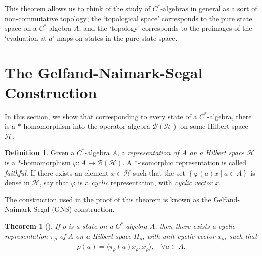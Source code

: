 \documentclass[11pt,a4paper]{report}
\theoremstyle{plain}
\newtheorem{thm}{Theorem}
\theoremstyle{definition}
\newtheorem{defn}{Definition}
\newcommand{\1}{\mathbbm{1}}
\renewcommand{\H}{\mathcal{H}}
\newcommand{\B}{\mathcal{B}}
\newcommand{\BH}{\mathcal{\B(\H)}}
\renewcommand{\phi}{\varphi}
\begin{document}
This theorem allows us to think of the study of $C^\ast$-algebras in general as 
a sort of non-commutative topology; the `topological space' corresponds to the 
pure state space on a $C^\ast$-algebra $A$, and the `topology' corresponds to 
the preimages of the `evaluation at $a$' maps on states in the pure state space.



	
\section{The Gelfand-Naimark-Segal Construction}
In this section, we show that corresponding to every state of a 
$C^\ast$-algebra, there is a $\ast$-homomorphism into the operator algebra 
$\B(\H)$ on some Hilbert space $\H$. 


\begin{defn}
	Given a $C^\ast$-algebra $A$, a \emph{representation of $A$ on a Hilbert space 
	$\H$} is a $\ast$-homomorphism $\phi: A \to \BH$. A $\ast$-isomorphic 
	representation is called \emph{faithful}. If there exists an element $x\in\H$ 
	such that the set $\left\{\phi(a)x \mid a\in A\right\}$ is dense in $\H$, say 
	that $\phi$ is a \emph{cyclic} representation, with \emph{cyclic vector} $x$.

\end{defn}	
The construction used in the proof of this theorem is known as the 
Gelfand-Naimark-Segal (GNS) construction.
\begin{thm}[{\cite[4.5.2]{kadison83}}]\label{thm:gns}
	If $\rho$ is a state on a $C^\ast$-algebra $A$, then there exists a cyclic 
	representation $\pi_\rho$ of $A$ on a Hilbert space ${H}_\rho$, with unit cyclic 
	vector $x_\rho$, such that 
	\begin{align*} 
		\rho(a)= \langle \pi_\rho (a) x_\rho, x_\rho \rangle, ~~~~ \forall a \in A.
	\end{align*}
\end{thm}
\end{document}
